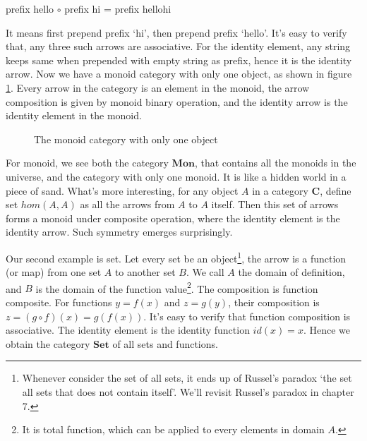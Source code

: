 \documentclass{article}
\begin{document}
\begin{center}
prefix hello $\circ$ prefix hi = prefix hellohi
\end{center}

It means first prepend prefix `hi', then prepend prefix `hello'. It's easy to verify that, any three such arrows are associative. For the identity element, any string keeps same when prepended with empty string as prefix, hence it is the identity arrow. Now we have a monoid category with only one object, as shown in figure \ref{fig:monoid-as-category}. Every arrow in the category is an element in the monoid, the arrow composition is given by monoid binary operation, and the identity arrow is the identity element in the monoid.

\begin{figure}[htbp]
\centering
{}
\caption{The monoid category with only one object}
\label{fig:monoid-as-category}
\end{figure}

For monoid, we see both the category $\pmb{Mon}$, that contains all the monoids in the universe, and the category with only one monoid. It is like a hidden world in a piece of sand. What's more interesting, for any object $A$ in a category $\pmb{C}$, define set $hom(A, A)$ as all the arrows from $A$ to $A$ itself. Then this set of arrows forms a monoid under composite operation, where the identity element is the identity arrow. Such symmetry emerges surprisingly.

Our second example is set. Let every set be an object\footnote{Whenever consider the set of all sets, it ends up of Russel's paradox `the set all sets that does not contain itself'. We'll revisit Russel's paradox in chapter 7.}, the arrow is a function (or map) from one set $A$ to another set $B$. We call $A$ the domain of definition, and $B$ is the domain of the function value\footnote{It is total function, which can be applied to every elements in domain $A$.}. The composition is function composite. For functions $y = f(x)$ and $z = g(y)$, their composition is $z = (g \circ f)(x) = g(f(x))$. It's easy to verify that function composition is associative. The identity element is the identity function $id(x) = x$. Hence we obtain the category $\pmb{Set}$ of all sets and functions.
\end{document}
